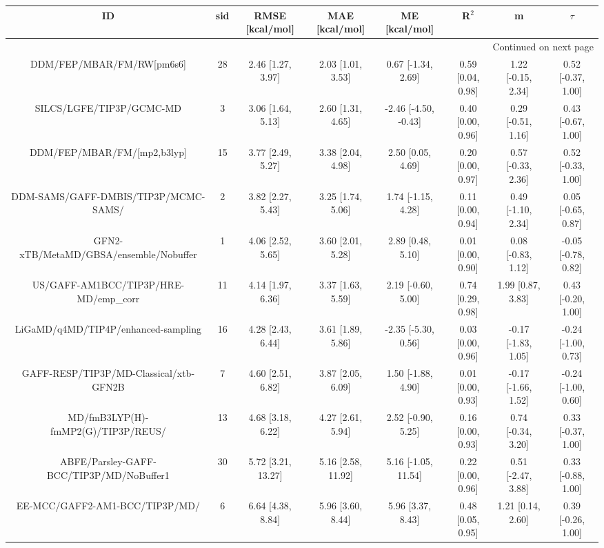 \documentclass[8pt]{article}
\begin{document}
\begin{center}
\begin{footnotesize}
\begin{longtable}{|cccccccc|}
\toprule
                                       ID & sid &     RMSE [kcal/mol] &      MAE [kcal/mol] &         ME [kcal/mol] &              R$^2$ &                    m &               $\tau$ \\
\midrule
\endhead
\midrule
\multicolumn{8}{r}{{Continued on next page}} \\
\midrule
\endfoot

\bottomrule
\endlastfoot
                DDM/FEP/MBAR/FM/RW[pm6s6] &  28 &   2.46 [1.27, 3.97] &   2.03 [1.01, 3.53] &    0.67 [-1.34, 2.69] &  0.59 [0.04, 0.98] &   1.22 [-0.15, 2.34] &   0.52 [-0.37, 1.00] \\
                 SILCS/LGFE/TIP3P/GCMC-MD &   3 &   3.06 [1.64, 5.13] &   2.60 [1.31, 4.65] &  -2.46 [-4.50, -0.43] &  0.40 [0.00, 0.96] &   0.29 [-0.51, 1.16] &   0.43 [-0.67, 1.00] \\
              DDM/FEP/MBAR/FM/[mp2,b3lyp] &  15 &   3.77 [2.49, 5.27] &   3.38 [2.04, 4.98] &     2.50 [0.05, 4.69] &  0.20 [0.00, 0.97] &   0.57 [-0.33, 2.36] &   0.52 [-0.33, 1.00] \\
     DDM-SAMS/GAFF-DMBIS/TIP3P/MCMC-SAMS/ &   2 &   3.82 [2.27, 5.43] &   3.25 [1.74, 5.06] &    1.74 [-1.15, 4.28] &  0.11 [0.00, 0.94] &   0.49 [-1.10, 2.34] &   0.05 [-0.65, 0.87] \\
   GFN2-xTB/MetaMD/GBSA/ensemble/Nobuffer &   1 &   4.06 [2.52, 5.65] &   3.60 [2.01, 5.28] &     2.89 [0.48, 5.10] &  0.01 [0.00, 0.90] &   0.08 [-0.83, 1.12] &  -0.05 [-0.78, 0.82] \\
    US/GAFF-AM1BCC/TIP3P/HRE-MD/emp\_corr &  11 &   4.14 [1.97, 6.36] &   3.37 [1.63, 5.59] &    2.19 [-0.60, 5.00] &  0.74 [0.29, 0.98] &    1.99 [0.87, 3.83] &   0.43 [-0.20, 1.00] \\
      LiGaMD/q4MD/TIP4P/enhanced-sampling &  16 &   4.28 [2.43, 6.44] &   3.61 [1.89, 5.86] &   -2.35 [-5.30, 0.56] &  0.03 [0.00, 0.96] &  -0.17 [-1.83, 1.05] &  -0.24 [-1.00, 0.73] \\
   GAFF-RESP/TIP3P/MD-Classical/xtb-GFN2B &   7 &   4.60 [2.51, 6.82] &   3.87 [2.05, 6.09] &    1.50 [-1.88, 4.90] &  0.01 [0.00, 0.93] &  -0.17 [-1.66, 1.52] &  -0.24 [-1.00, 0.60] \\
       MD/fmB3LYP(H)-fmMP2(G)/TIP3P/REUS/ &  13 &   4.68 [3.18, 6.22] &   4.27 [2.61, 5.94] &    2.52 [-0.90, 5.25] &  0.16 [0.00, 0.93] &   0.74 [-0.34, 3.20] &   0.33 [-0.37, 1.00] \\
 ABFE/Parsley-GAFF-BCC/TIP3P/MD/NoBuffer1 &  30 &  5.72 [3.21, 13.27] &  5.16 [2.58, 11.92] &   5.16 [-1.05, 11.54] &  0.22 [0.00, 0.96] &   0.51 [-2.47, 3.88] &   0.33 [-0.88, 1.00] \\
           EE-MCC/GAFF2-AM1-BCC/TIP3P/MD/ &   6 &   6.64 [4.38, 8.84] &   5.96 [3.60, 8.44] &     5.96 [3.37, 8.43] &  0.48 [0.05, 0.95] &    1.21 [0.14, 2.60] &   0.39 [-0.26, 1.00] \\
\end{longtable}
\end{footnotesize}
\end{center}
\end{document}
